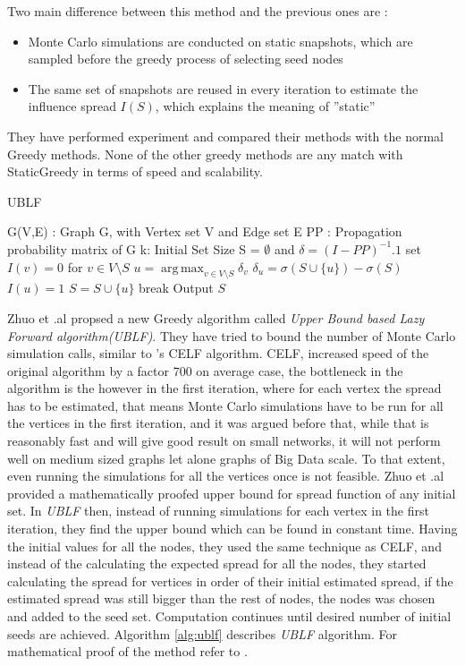 \documentclass[english]{tktltiki}
\DeclareMathOperator*{\argmax}{arg\,max}
\begin{document}
Two main difference between this method and the previous ones are :
\begin{itemize}
\item
Monte Carlo simulations are conducted on static snapshots, which are sampled before the greedy process of selecting seed nodes
\item
The same set of snapshots are reused in every iteration to estimate the influence spread $I(S)$, which explains the meaning of ''static''
\end{itemize}

They have performed experiment and compared their methods with the normal Greedy methods. None of the other greedy methods are any match with StaticGreedy in terms of speed and scalability. \\
\begin{algorithm}[ht!]
\caption{UBLF}
\label{alg:ublf}
\begin{algorithmic}
\Require G(V,E) : Graph G, with Vertex set V and Edge set E
\Require PP : Propagation probability matrix of G
\Require k: Initial Set Size
\State S = $\emptyset$ and $\delta = (I - PP)^{-1} .1$ 
	\State set $I(v) = 0$ for $v \in V \setminus S$
		\State $u =  \argmax_{v \in V \setminus S}\delta_v$ 
			\State $\delta_u = \sigma( S \cup \{u\}) - \sigma(S)$
			\State $I(u)=1$
		\EndIf
			\State $S = S \cup \{u\}$
			\State break
		\EndIf
	\EndWhile 
\EndFor
\State Output $S$
\end{algorithmic}
\end{algorithm}
Zhuo et .al \cite{zhuo13} propsed a new Greedy algorithm called \textit{Upper Bound based Lazy Forward algorithm(UBLF)}. They have tried to bound the number of Monte Carlo simulation calls, similar to \cite{leskovec07}'s CELF algorithm. CELF, increased speed of the original algorithm by a factor 700 on average case, the bottleneck in the algorithm is the however in the first iteration, where for each vertex the spread has to be estimated, that means Monte Carlo simulations have to be run for all the vertices in the first iteration, and it was argued before that, while that is reasonably fast and will give good result on small networks, it will not perform well on medium sized graphs let alone graphs of Big Data scale. To that extent, even running the simulations for all the vertices once is not feasible. Zhuo et .al provided a mathematically proofed upper bound for spread function of any initial set. In \textit{UBLF} then, instead of running simulations for each vertex in the first iteration, they find the upper bound which can be found in constant time. Having the initial values for all the nodes, they used the same technique as CELF, and instead of the calculating the expected spread for all the nodes, they started calculating the spread for vertices in order of their initial estimated spread, if the estimated spread was still bigger than the rest of nodes, the nodes was chosen and added to the seed set. Computation continues until desired number of initial seeds are achieved. Algorithm \ref{alg:ublf} describes \textit{UBLF} algorithm. For mathematical proof of the method refer to \cite{zhuo13}.
\end{document}
